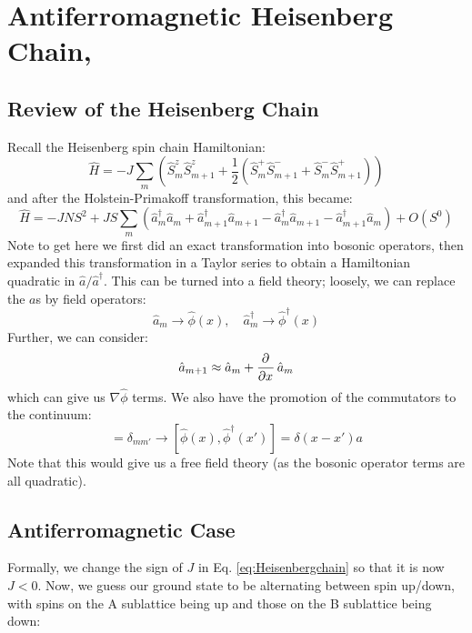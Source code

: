 \section{Antiferromagnetic Heisenberg Chain,}
\subsection{Review of the Heisenberg Chain}
Recall the Heisenberg spin chain Hamiltonian:
\begin{equation}\label{eq:Heisenbergchain}
    \hat{H} = -J\sum_m\left(\hat{S}^z_m\hat{S}^z_{m+1} + \frac{1}{2}\left(\hat{S}^+_m\hat{S}^-_{m+1} + \hat{S}^-_m \hat{S}^+_{m+1}\right)\right)
\end{equation}
and after the Holstein-Primakoff transformation, this became:
\begin{equation}
    \hat{H} = -JNS^2 + JS\sum_{m}\left(\hat{a}^\dag_m\hat{a}_m + \hat{a}^\dag_{m+1}\hat{a}_{m+1} - \hat{a}^\dag_m\hat{a}_{m+1} - \hat{a}^\dag_{m+1}\hat{a}_m\right) + O(S^0)
\end{equation}
Note to get here we first did an exact transformation into bosonic operators, then expanded this transformation in a Taylor series to obtain a Hamiltonian quadratic in $\hat{a}/\hat{a}^\dag$. This can be turned into a field theory; loosely, we can replace the $a$s by field operators:
\begin{equation}
    \hat{a}_m \to \hat{\phi}(x), \quad \hat{a}^\dag_m \to \hat{\phi}^\dag(x)
\end{equation}
Further, we can consider:
\begin{equation}
    \hat{a}_{m+1} \approx \hat{a}_m + \dpd{}{x}\hat{a}_m
\end{equation}
which can give us $\nabla \hat{\phi}$ terms. We also have the promotion of the commutators to the continuum:
\begin{equation}
    [\hat{a}_m, \hat{a}^\dag_{m'}] = \delta_{mm'} \to [\hat{\phi}(x), \hat{\phi}^\dag(x')] = \delta(x - x')a
\end{equation}
Note that this would give us a free field theory (as the bosonic operator terms are all quadratic).

\subsection{Antiferromagnetic Case}
Formally, we change the sign of $J$ in Eq. \eqref{eq:Heisenbergchain} so that it is now $J < 0$. Now, we guess our ground state to be alternating between spin up/down, with spins on the A sublattice being up and those on the B sublattice being down:

